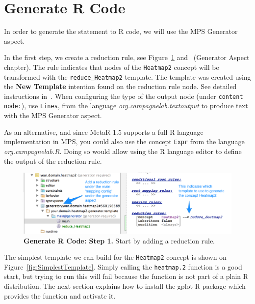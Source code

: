 \section{Generate R Code}
In order to generate the statement to R code, we will use the MPS Generator aspect. 

In the first step, we create a reduction rule, see Figure~\ref{fig:GeneratorHowToStep1} and~\cite{campagne2014mps} (Generator Aspect chapter). The rule indicates that nodes of the \texttt{Heatmap2} concept will be transformed with the \texttt{reduce\_Heatmap2} template. The template was created using the \textbf{New Template} intention found on the reduction rule node. See detailed instructions in~\cite{campagne2014mps}. When configuring the type of the output node (under \texttt{content node:}), use \texttt{Lines}, from the language \textit{org.campagnelab.textoutput} to produce text with the MPS Generator aspect.
\begin{remark}
As an alternative, and since MetaR 1.5 supports a full R language implementation in MPS, you could also use the concept \texttt{Expr} from the  language \textit{org.campagnelab.R}. Doing so would allow using the R language editor to define the output of the reduction rule.  
\end{remark}

\begin{figure}[h!tbp]
  \centering
  \includegraphics[width=\figWidthWide]{figures/GeneratorHowToStep1.png}
\caption[Generate R Code: Step 1.]{\textbf{Generate R Code: Step 1.} Start by adding a reduction rule.}
\label{fig:GeneratorHowToStep1}
\end{figure}

The simplest template we can build for the \texttt{Heatmap2} concept is shown on Figure~\ref{fig:SimplestTemplate}. Simply calling the \texttt{heatmap.2} function is a good start, but trying to run this will fail because the function is not part of a plain R distribution. The next section explains how to install the gplot R package which provides the function and activate it. 

